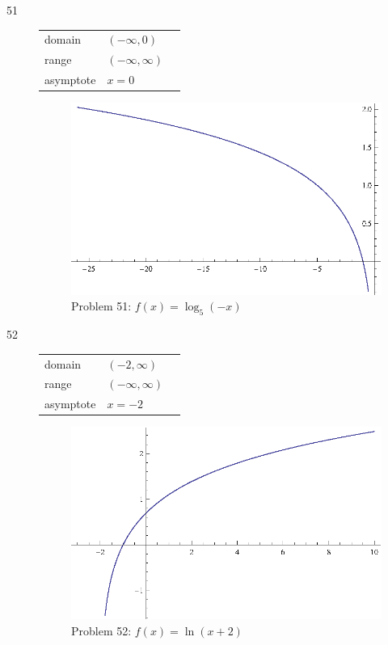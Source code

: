\documentclass{exam}
\begin{document}
\begin{description}
    \item[51]
      \begin{tabular}[H]{lll}
        \toprule
        domain    & $(-\infty, 0)$ \\
        range     & $(-\infty, \infty)$ \\
        asymptote & $x = 0$ \\
        \bottomrule
      \end{tabular}

      \begin{figure}[H]
        \centering
        \includegraphics[scale = 0.9]{problem51.eps}
        \caption{Problem 51: $f(x) = \log_{5} (-x)$}
      \end{figure}

    \item[52]
      \begin{tabular}[H]{lll}
        \toprule
        domain    & $(-2, \infty)$ \\
        range     & $(-\infty, \infty)$ \\
        asymptote & $x = -2$ \\
        \bottomrule
      \end{tabular}

      \begin{figure}[H]
        \centering
        \includegraphics[scale = 0.9]{problem52.eps}
        \caption{Problem 52: $f(x) = \ln(x + 2)$}
      \end{figure}


\end{description}
\end{document}
